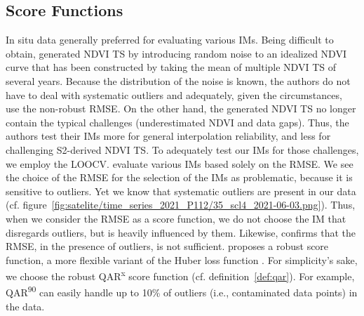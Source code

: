 {    \subsection{Score Functions}{
        In situ data generally preferred for evaluating various IMs. Being difficult to obtain, \cite{liHighqualityVegetationIndex2021} generated NDVI TS by introducing random noise to an idealized NDVI curve that has been constructed by taking the mean of multiple NDVI TS of several years. Because the distribution of the noise is known, the authors do not have to deal with systematic outliers and adequately, given the circumstances, use the non-robust RMSE. On the other hand, the generated NDVI TS no longer contain the typical challenges (underestimated NDVI and data gaps). Thus, the authors test their IMs more for general interpolation reliability, and less for challenging S2-derived NDVI TS. To adequately test our IMs for those challenges, we employ the LOOCV.
        \cite{caiPerformanceSmoothingMethods2017a} evaluate various IMs based solely on the RMSE. We see the choice of the RMSE for the selection of the IMs as problematic, because it is sensitive to outliers. Yet we know that systematic outliers are present in our data (cf. figure~\ref{fig:satelite/time_series_2021_P112/35_scl4_2021-06-03.png}). Thus, when we consider the RMSE as a score function, we do not choose the IM that disregards outliers, but is heavily influenced by them. Likewise, \cite{liemohnRMSENotEnough2021} confirms that the RMSE, in the presence of outliers, is not sufficient. \cite{barronGeneralAdaptiveRobust2019} proposes a robust score function, a more flexible variant of the Huber loss function \citep{huberRobustEstimationLocation1964}. For simplicity's sake, we choose the robust QAR\textsuperscript{x} score function (cf. definition~\ref{def:qar}). For example, QAR\textsuperscript{90} can easily handle up to 10\% of outliers (i.e., contaminated data points) in the data.                 
    }
}


